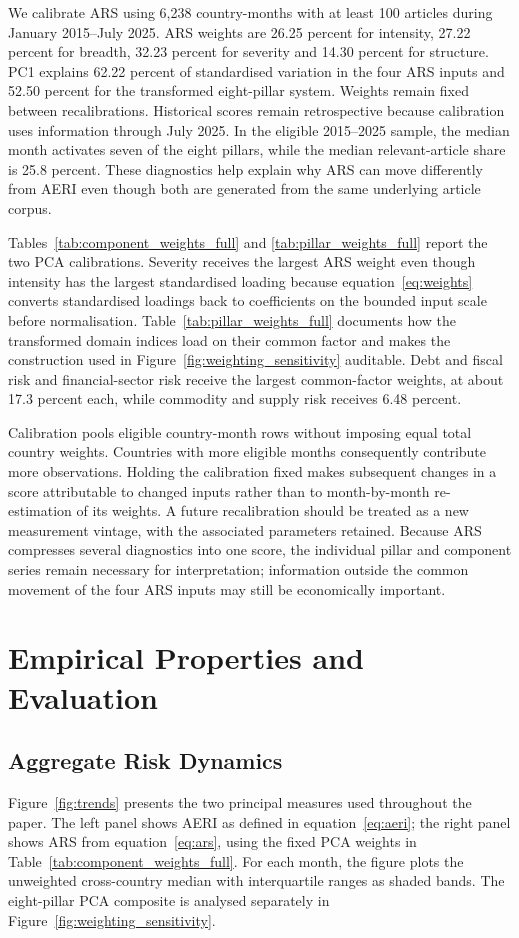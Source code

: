 \documentclass[12pt]{article}
\begin{document}
We calibrate ARS using 6,238 country-months with at least 100 articles during January 2015--July 2025. ARS weights are 26.25 percent for intensity, 27.22 percent for breadth, 32.23 percent for severity and 14.30 percent for structure. PC1 explains 62.22 percent of standardised variation in the four ARS inputs and 52.50 percent for the transformed eight-pillar system. Weights remain fixed between recalibrations. Historical scores remain retrospective because calibration uses information through July 2025. In the eligible 2015--2025 sample, the median month activates seven of the eight pillars, while the median relevant-article share is 25.8 percent. These diagnostics help explain why ARS can move differently from AERI even though both are generated from the same underlying article corpus.

Tables~\ref{tab:component_weights_full} and \ref{tab:pillar_weights_full} report the two PCA calibrations. Severity receives the largest ARS weight even though intensity has the largest standardised loading because equation~\eqref{eq:weights} converts standardised loadings back to coefficients on the bounded input scale before normalisation. Table~\ref{tab:pillar_weights_full} documents how the transformed domain indices load on their common factor and makes the construction used in Figure~\ref{fig:weighting_sensitivity} auditable. Debt and fiscal risk and financial-sector risk receive the largest common-factor weights, at about 17.3 percent each, while commodity and supply risk receives 6.48 percent.

Calibration pools eligible country-month rows without imposing equal total country weights. Countries with more eligible months consequently contribute more observations. Holding the calibration fixed makes subsequent changes in a score attributable to changed inputs rather than to month-by-month re-estimation of its weights. A future recalibration should be treated as a new measurement vintage, with the associated parameters retained. Because ARS compresses several diagnostics into one score, the individual pillar and component series remain necessary for interpretation; information outside the common movement of the four ARS inputs may still be economically important.


\section{Empirical Properties and Evaluation}\label{sec:results}
\subsection{Aggregate Risk Dynamics}\label{sec:aggregate_risk}
Figure~\ref{fig:trends} presents the two principal measures used throughout the paper. The left panel shows AERI as defined in equation~\eqref{eq:aeri}; the right panel shows ARS from equation~\eqref{eq:ars}, using the fixed PCA weights in Table~\ref{tab:component_weights_full}. For each month, the figure plots the unweighted cross-country median with interquartile ranges as shaded bands. The eight-pillar PCA composite is analysed separately in Figure~\ref{fig:weighting_sensitivity}.
\end{document}
